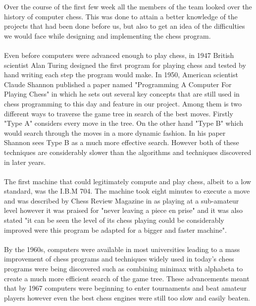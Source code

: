 \documentclass{l3proj}
\begin{document}
Over the course of the first few week all the members of the team looked over the history of computer chess. This was done to attain a better knowledge of the projects that had been done before us, but also to get an idea of the difficulties we would face while designing and implementing the chess program. \\\\
Even before computers were advanced enough to play chess, in 1947 British scientist Alan Turing designed the first program for playing chess and tested by hand writing each step the program would make.\cite{MuseumOrigins} In 1950, American scientist Claude Shannon published a paper named "Programming A Computer For Playing Chess" in which he sets out several key concepts that are still used in chess programming to this day and feature in our project. Among them is two different ways to traverse the game tree in search of the best moves. Firstly "Type A" considers every move in the tree. On the other hand "Type B" which would search through the moves in a more dynamic fashion. \cite{ProgrammingPlaying} In his paper Shannon sees Type B as a much more effective search. However both of these techniques are considerably slower than the algorithms and techniques discovered in later years. \\\\
The first machine that could legitimately compute and play chess, albeit to a low standard, was the I.B.M 704. The machine took eight minutes to execute a move and was described by Chess Review Magazine in as playing at a sub-amateur level however it was praised for
 "never leaving a piece en prise" and it was also stated "it can be seen the level of its chess playing could be considerably improved were this program be adapted for a bigger and faster machine". \cite{IBM704} \\\\
By the 1960s, computers were available in most universities leading to a mass improvement of chess programs and techniques widely used in today's chess programs were being discovered such as combining minimax with alphabeta to create a much more efficient search of the game tree. These advancements meant that by 1967 computers were beginning to enter tournaments and beat amateur players \cite{MuseumGoing} however even the best chess engines were still too slow and easily beaten.  \\\\
\end{document}
